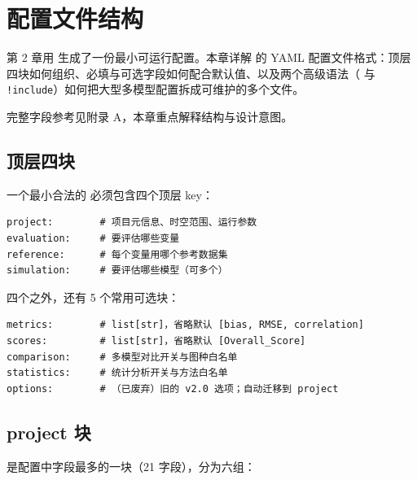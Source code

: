 
\chapter{配置文件结构}

第 2 章用  生成了一份最小可运行配置。本章详解 \openbench{} 的 YAML 配置文件格式：顶层四块如何组织、必填与可选字段如何配合默认值、以及两个高级语法（ 与 \texttt{!include}）如何把大型多模型配置拆成可维护的多个文件。

完整字段参考见附录 A，本章重点解释结构与设计意图。

\section{顶层四块}

一个最小合法的  必须包含四个顶层 key：

\begin{verbatim}
project:        # 项目元信息、时空范围、运行参数
evaluation:     # 要评估哪些变量
reference:      # 每个变量用哪个参考数据集
simulation:     # 要评估哪些模型（可多个）
\end{verbatim}

四个之外，还有 5 个常用可选块：

\begin{verbatim}
metrics:        # list[str]，省略默认 [bias, RMSE, correlation]
scores:         # list[str]，省略默认 [Overall_Score]
comparison:     # 多模型对比开关与图种白名单
statistics:     # 统计分析开关与方法白名单
options:        # （已废弃）旧的 v2.0 选项；自动迁移到 project
\end{verbatim}



\section{project 块}

 是配置中字段最多的一块（21 字段），分为六组：

